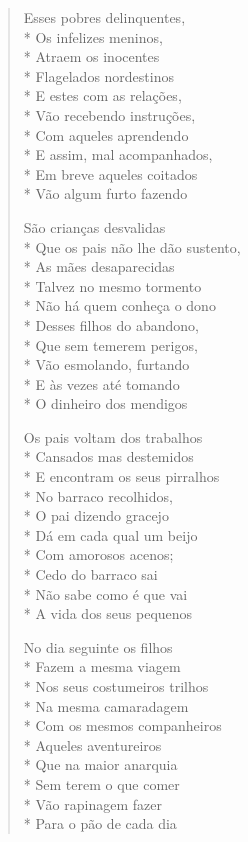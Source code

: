 \begin{verse}
Esses pobres delinquentes,\\*
Os infelizes meninos,\\*
Atraem os inocentes\\*
Flagelados nordestinos\\*
E estes com as relações,\\*
Vão recebendo instruções,\\*
Com aqueles aprendendo\\*
E assim, mal acompanhados,\\*
Em breve aqueles coitados\\*
Vão algum furto fazendo

São crianças desvalidas\\*
Que os pais não lhe dão sustento,\\*
As mães desaparecidas\\*
Talvez no mesmo tormento\\*
Não há quem conheça o dono\\*
Desses filhos do abandono,\\*
Que sem temerem perigos,\\*
Vão esmolando, furtando\\*
E às vezes até tomando\\*
O dinheiro dos mendigos

Os pais voltam dos trabalhos\\*
Cansados mas destemidos\\*
E encontram os seus pirralhos\\*
No barraco recolhidos,\\*
O pai dizendo gracejo\\*
Dá em cada qual um beijo\\*
Com amorosos acenos;\\*
Cedo do barraco sai\\*
Não sabe como é que vai\\*
A vida dos seus pequenos

No dia seguinte os filhos\\*
Fazem a mesma viagem\\*
Nos seus costumeiros trilhos\\*
Na mesma camaradagem\\*
Com os mesmos companheiros\\*
Aqueles aventureiros\\*
Que na maior anarquia\\*
Sem terem o que comer\\*
Vão rapinagem fazer\\*
Para o pão de cada dia


\end{verse}
